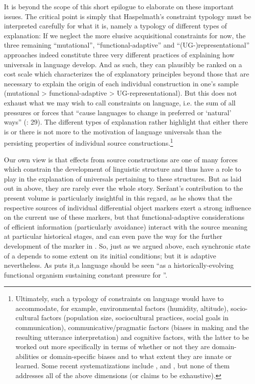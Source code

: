 \documentclass[output=paper]{langsci/langscibook}
\begin{document}
It is beyond the scope of this short epilogue to elaborate on these important issues. The critical point is simply that Haspelmath’s constraint typology must be interpreted carefully for what it is, namely a typology of different types of explanation: If we neglect the more elusive acquisitional constraints for now, the three remaining “mutational”, “functional-adaptive” and “(UG-)representational” approaches indeed constitute three very different practices of explaining how universals in language develop. And as such, they can plausibly be ranked on a cost scale which characterizes the  of explanatory principles beyond those that are necessary to explain the origin of each individual construction in one’s sample (mutational > functional-adaptive > UG-representational). But this does not exhaust what we may wish to call constraints on language, i.e. the sum of all pressures or forces that “cause languages to change in preferred or ‘natural’ ways” (\citealt{BickelEtAl2015}: 29). The different types of explanation rather highlight that either there is or there is not more to the motivation of language universals than the persisting properties of individual source constructions.\footnote{Ultimately, such a typology of constraints on language would have to accommodate, for example, environmental factors (humidity, altitude), socio-cultural factors (population size, sociocultural practices, social goals in communication), communicative/pragmatic factors (biases in  making and the resulting utterance interpretation) and cognitive factors, with the latter to be worked out more specifically in terms of whether or not they are domain- abilities or domain-specific biases and to what extent they are innate or learned. Some recent systematizations include \citet{ChristiansenChater2008}, \citet{EvansLevinson2009} and \citet{Bybee2010}, but none of them addresses all of the above dimensions (or claims to be exhaustive).} 

Our own view is that  effects from source constructions are one of many forces which constrain the development of linguistic structure and thus have a role to play in the explanation of universals pertaining to these structures. But as laid out in  above, they are rarely ever the whole story. Seržant’s contribution to the present volume is particularly insightful in this regard, as he shows that the respective sources of individual differential object markers exert a strong influence on the current use of these markers, but that functional-adaptive considerations of efficient information  (particularly  avoidance) interact with the source meaning at particular historical stages, and can even pave the way for the further development of the marker in . So, just as we argued above, each synchronic state of a  depends to some extent on its initial conditions; but it is adaptive nevertheless. As \citet[263]{Shibatani2006} puts it,\largerpage a language should be seen “as a historically-evolving functional organism sustaining constant pressure for ”. 
\end{document}
